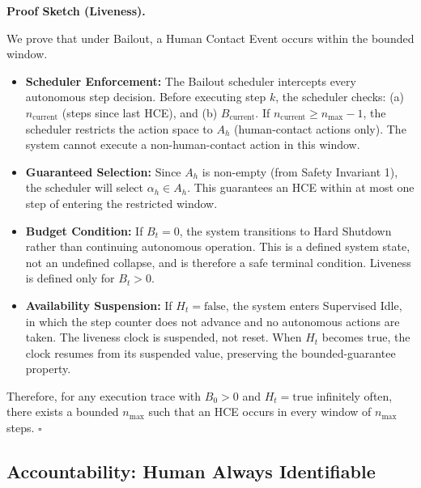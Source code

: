 \textbf{Proof Sketch (Liveness).}

\begin{Proof}
We prove that under Bailout, a Human Contact Event occurs within the bounded window.

\begin{itemize}
    \item \textbf{Scheduler Enforcement:} The Bailout scheduler intercepts every autonomous step decision. Before executing step $k$, the scheduler checks: (a) $n_\text{current}$ (steps since last HCE), and (b) $B_\text{current}$. If $n_\text{current} \geq n_\text{max} - 1$, the scheduler restricts the action space to $A_h$ (human-contact actions only). The system cannot execute a non-human-contact action in this window.

    \item \textbf{Guaranteed Selection:} Since $A_h$ is non-empty (from Safety Invariant 1), the scheduler will select $\alpha_h \in A_h$. This guarantees an HCE within at most one step of entering the restricted window.

    \item \textbf{Budget Condition:} If $B_t = 0$, the system transitions to Hard Shutdown rather than continuing autonomous operation. This is a defined system state, not an undefined collapse, and is therefore a safe terminal condition. Liveness is defined only for $B_t > 0$.

    \item \textbf{Availability Suspension:} If $H_t = \text{false}$, the system enters Supervised Idle, in which the step counter does not advance and no autonomous actions are taken. The liveness clock is suspended, not reset. When $H_t$ becomes true, the clock resumes from its suspended value, preserving the bounded-guarantee property.
\end{itemize}

Therefore, for any execution trace with $B_0 > 0$ and $H_t = \text{true}$ infinitely often, there exists a bounded $n_\text{max}$ such that an HCE occurs in every window of $n_\text{max}$ steps. $\square$
\end{Proof}

\subsection{Accountability: Human Always Identifiable}

